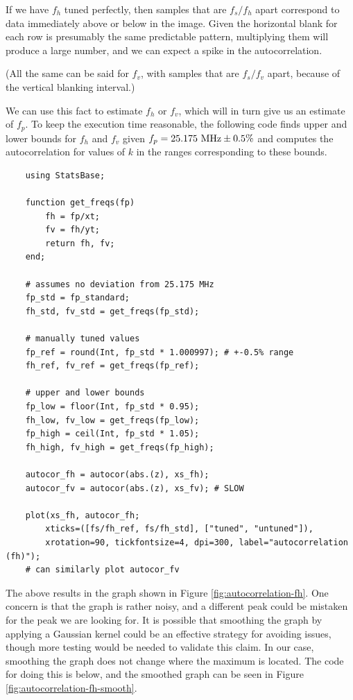 \documentclass{article}
\begin{document}
If we have $f_h$ tuned perfectly, then samples that are $f_s/f_h$ apart correspond to data immediately above or below in the image. Given the horizontal blank for each row is presumably the same predictable pattern, multiplying them will produce a large number, and we can expect a spike in the autocorrelation.

(All the same can be said for $f_v$, with samples that are $f_s/f_v$ apart, because of the vertical blanking interval.)

We can use this fact to estimate $f_h$ or $f_v$, which will in turn give us an estimate of $f_p$. To keep the execution time reasonable, the following code finds upper and lower bounds for $f_h$ and $f_v$ given $f_p = \textnormal{25.175 MHz} \pm \textnormal{0.5\%}$ and computes the autocorrelation for values of $k$ in the ranges corresponding to these bounds.

\begin{verbatim}
    using StatsBase;

    function get_freqs(fp)
        fh = fp/xt;
        fv = fh/yt;
        return fh, fv;
    end;

    # assumes no deviation from 25.175 MHz
    fp_std = fp_standard;
    fh_std, fv_std = get_freqs(fp_std);

    # manually tuned values
    fp_ref = round(Int, fp_std * 1.000997); # +-0.5% range
    fh_ref, fv_ref = get_freqs(fp_ref);

    # upper and lower bounds
    fp_low = floor(Int, fp_std * 0.95);
    fh_low, fv_low = get_freqs(fp_low);
    fp_high = ceil(Int, fp_std * 1.05);
    fh_high, fv_high = get_freqs(fp_high);

    autocor_fh = autocor(abs.(z), xs_fh);
    autocor_fv = autocor(abs.(z), xs_fv); # SLOW

    plot(xs_fh, autocor_fh;
        xticks=([fs/fh_ref, fs/fh_std], ["tuned", "untuned"]),
        xrotation=90, tickfontsize=4, dpi=300, label="autocorrelation (fh)");
    # can similarly plot autocor_fv
\end{verbatim}

The above results in the graph shown in Figure \ref{fig:autocorrelation-fh}. One concern is that the graph is rather noisy, and a different peak could be mistaken for the peak we are looking for. It is possible that smoothing the graph by applying a Gaussian kernel could be an effective strategy for avoiding issues, though more testing would be needed to validate this claim. In our case, smoothing the graph does not change where the maximum is located. The code for doing this is below, and the smoothed graph can be seen in Figure \ref{fig:autocorrelation-fh-smooth}.
\end{document}
